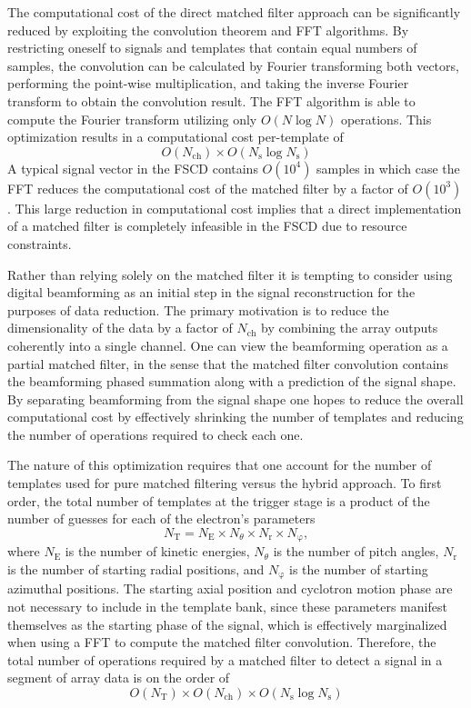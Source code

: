 The computational cost of the direct matched filter approach can be significantly reduced by exploiting the convolution theorem and FFT algorithms. By restricting oneself to signals and templates that contain equal numbers of samples, the convolution can be calculated by Fourier transforming both vectors, performing the point-wise multiplication, and taking the inverse Fourier transform to obtain the convolution result. The FFT algorithm is able to compute the Fourier transform utilizing only $O(N\log{N})$ operations. This optimization results in a computational cost per-template of
\begin{equation}
    O(N_\mathrm{ch})\times O(N_\mathrm{s}\log{N_\mathrm{s}})
\end{equation}
A typical signal vector in the FSCD contains $O(10^4)$ samples in which case the FFT reduces the computational cost of the matched filter by a factor of $O(10^3)$. This large reduction in computational cost implies that a direct implementation of a matched filter is completely infeasible in the FSCD due to resource constraints. 

Rather than relying solely on the matched filter it is tempting to consider using digital beamforming as an initial step in the signal reconstruction for the purposes of data reduction. The primary motivation is to reduce the dimensionality of the data by a factor of $N_\mathrm{ch}$ by combining the array outputs coherently into a single channel. One can view the beamforming operation as a partial matched filter, in the sense that the matched filter convolution contains the beamforming phased summation along with a prediction of the signal shape. By separating beamforming from the signal shape one hopes to reduce the overall computational cost by effectively shrinking the number of templates and reducing the number of operations required to check each one.

The nature of this optimization requires that one account for the number of templates used for pure matched filtering versus the hybrid approach. To first order, the total number of templates at the trigger stage is a product of the number of guesses for each of the electron's parameters
\begin{equation}
    N_\mathrm{T}=N_\mathrm{E}\times N_\theta \times N_\mathrm{r} \times N_\mathrm{\varphi},
\end{equation}
where $N_\mathrm{E}$ is the number of kinetic energies, $N_\theta$ is the number of pitch angles, $N_\mathrm{r}$ is the number of starting radial positions, and $N_\mathrm{\varphi}$ is the number of starting azimuthal positions. The starting axial position and cyclotron motion phase are not necessary to include in the template bank, since these parameters manifest themselves as the starting phase of the signal, which is effectively marginalized when using a FFT to compute the matched filter convolution. Therefore, the total number of operations required by a matched filter to detect a signal in a segment of array data is on the order of 
\begin{equation}
    O(N_\mathrm{T})\times O(N_\mathrm{ch})\times O(N_\mathrm{s}\log{N_\mathrm{s}})
    \label{eq:chap4-tot-ops-pure-mf}
\end{equation}

